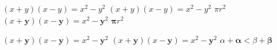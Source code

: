 \documentclass[a4paper]{article}
\begin{document}
$(x+y)(x-y)=x^{2}-y^{2}$
{\boldmath $(x+y)(x-y)=x^{2}-y^{2}$ $\pi r^2$}
$(x+\mathbf{y})(x-\mathbf{y})=x^{2}-{\mathbf{y}}^{2}$
$\mathbf{\pi} r^2$ %

$(x+\mathbf{y})(x-\mathbf{y})=x^{2}-{\mathbf{y}}^{2}$
$(x+\bm{y})(x-\bm{y}) \bm{=} x^{2}-{\bm{y}}^{2}$
$\alpha + \bm{\alpha} < \beta + \bm{\beta}$
\end{document}
